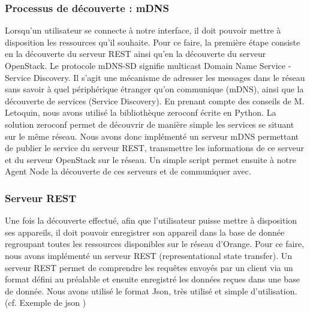 \documentclass[twocolumn,a4paper]{IEEEtranfr}
\begin{document}
\subsubsection{Processus de découverte : mDNS}

Lorsqu’un utilisateur se connecte à notre interface, il doit pouvoir mettre à disposition les ressources qu’il souhaite. Pour ce faire, la première étape consiste en la découverte du serveur REST ainsi qu’en la découverte du serveur OpenStack. Le protocole mDNS-SD signifie multicast Domain Name Service - Service Discovery. Il s’agit une mécanisme de adresser les messages dans le réseau sans savoir à quel périphérique étranger qu’on communique (mDNS), ainsi que la découverte de services (Service Discovery). En prenant compte des conseils de M. Letoquin, nous avons utilisé la bibliothèque zeroconf écrite en Python. La solution zeroconf permet de découvrir de manière simple les services se situant sur le même réseau. Nous avons donc implémenté un serveur mDNS permettant de publier le service du serveur REST, transmettre les informations de ce serveur et du serveur OpenStack sur le réseau. Un simple script permet ensuite à notre Agent Node la découverte de ces serveurs et de communiquer avec.

\subsubsection{Serveur REST}

Une fois la découverte effectué, afin que l’utilisateur puisse mettre à disposition ses appareils, il doit pouvoir enregistrer son appareil dans la base de donnée regroupant toutes les ressources disponibles sur le réseau d’Orange. Pour ce faire, nous avons implémenté un serveur REST (representational state transfer). Un serveur REST permet de comprendre les requêtes envoyés par un client via un format défini au préalable et ensuite enregistré les données reçues dans une base de donnée. Nous avons utilisé le format Json, très utilisé et simple d’utilisation.  (cf. Exemple de json )
\end{document}
